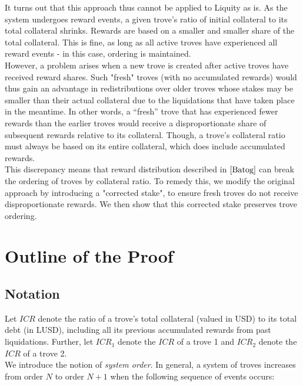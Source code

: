 \documentclass[reqno]{article}
\begin{document}
It turns out that this approach thus cannot be applied to Liquity as is. As the system undergoes reward events, a given trove’s ratio of initial collateral to its total collateral shrinks. Rewards are based on a smaller and smaller share of the total collateral. This is fine, as long as all active troves have experienced all reward events - in this case, ordering is maintained. \\

However, a problem arises when a new trove is created after active troves have received reward shares.  Such "fresh" troves (with no accumulated rewards) would thus gain an advantage in redistributions over older troves whose stakes may be smaller than their actual collateral due to the liquidations that have taken place in the meantime. In other words, a “fresh” trove that has experienced fewer rewards than the earlier troves would receive a disproportionate share of subsequent rewards relative to its collateral. Though, a trove's collateral ratio must always be based on its entire collateral, which does include accumulated rewards.  \\

This discrepancy means that reward distribution described in $\cite{Batog}$ can break the ordering of troves by collateral ratio. To remedy this, we modify the original approach by introducing a "corrected stake", to ensure fresh troves do not receive disproportionate rewards. We then show that this corrected stake preserves trove ordering. \\

\bigskip

\section{Outline of the Proof}
\subsection*{Notation}
Let $ICR$ denote the ratio of a trove's total collateral (valued in USD) to its total debt (in LUSD), including all its previous accumulated rewards from past liquidations. Further, let $ICR_1$ denote the $ICR$ of a trove 1 and $ICR_2$ denote the $ICR$ of a trove 2. \\

We introduce the notion of \textit{system order}. In general, a system of troves increases from order $N$ to order $N+1$ when the following sequence of events occurs:
\end{document}
